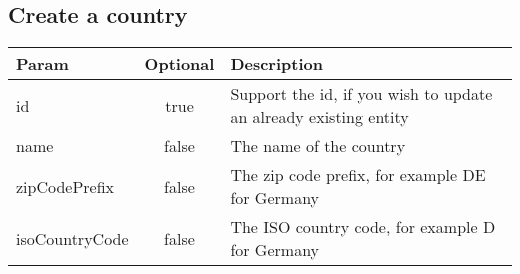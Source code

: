 \documentclass[a4paper,10pt]{book}
\newcommand{\thead}[1]{\textbf{\large{#1}}}
\begin{document}
\subsection{Create a country}
\label{s:ccountry}

\begin{tabular}{l | c | l}
\thead{Param} & \thead{Optional} & \thead{Description}\\
\hline
id & true & Support the id, if you wish to update an already existing entity\\
name & false & The name of the country \\
zipCodePrefix & false & The zip code prefix, for example DE for Germany \\
isoCountryCode & false & The ISO country code, for example D for Germany
 
\end{tabular} 
\end{document}
